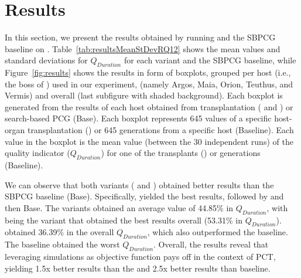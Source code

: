 \section{Results}
\label{sec:Results}

In this section, we present the results obtained by running \ApproachName{} and the SBPCG baseline on \CaseStudy{}.
Table~\ref{tab:resultsMeanStDevRQ12} shows the mean values and standard deviations for $Q_{Duration}$ for each \ApproachName{} variant and the SBPCG baseline, while Figure~\ref{fig:results} shows the results in form of boxplots, grouped per host (i.e., the boss of \CaseStudy{}) used in our experiment, (namely Argos, Maia, Orion, Teuthus, and Vermis) and overall (last subfigure with shaded background).  
Each boxplot is generated from the results of each host obtained from transplantation \ApproachName{} (\simhotep{} and \timhotep{}) or search-based PCG (Base). Each boxplot represents 645 values of a specific host-organ transplantation (\ApproachName{}) or 645 generations from a specific host (Baseline). Each value in the boxplot is the mean value (between the 30 independent runs) of the quality indicator ($Q_{Duration}$) for one of the transplants (\ApproachName{}) or generations (Baseline). 

We can observe that both variants (\simhotep{} and \timhotep{}) obtained better results than the SBPCG baseline (Base). Specifically, \simhotep{} yielded the best results, followed by \timhotep{} and then Base. The variants obtained an average value of 44.85\% in $Q_{Duration}$, with \simhotep{} being the variant that obtained the best results overall (53.31\% in $Q_{Duration}$). \timhotep obtained 36.39\% in the overall $Q_{Duration}$, which also outperformed the baseline. The baseline obtained the worst $Q_{Duration}$. Overall, the results reveal that leveraging simulations as objective function pays off in the context of PCT, yielding 1.5x better results than the \timhotep{} and 2.5x better results than baseline.


